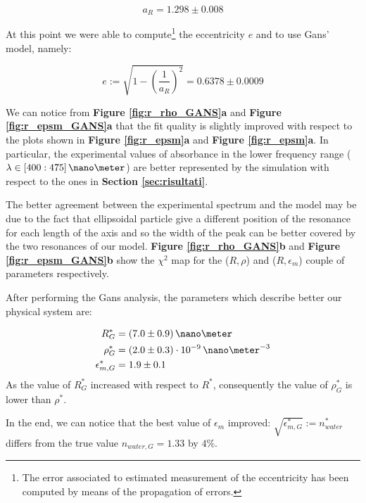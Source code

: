 \documentclass[twocolumn]{article}
\begin{document}
\begin{multicols}{2}
\[a_R=1.298\pm 0.008\]

At this point we were able to compute\footnote{The error associated to estimated measurement of the eccentricity has been computed by means of the propagation of errors.} the eccentricity $e$ and to use Gans' model, namely:

\[e:=\sqrt{1-\left(\frac{1}{a_R}\right)^2} = 0.6378 \pm 0.0009\]

We can notice from \textbf{Figure \ref{fig:r_rho_GANS}a} and \textbf{Figure \ref{fig:r_epsm_GANS}a } that the fit quality is slightly improved with respect to the plots shown in \textbf{Figure \ref{fig:r_epsm}a} and \textbf{Figure \ref{fig:r_epsm}a}. In particular, the experimental values of absorbance in the lower frequency range ($\lambda \in [400:475]\, \nano\meter$) are better represented by the simulation with respect to the ones in \textbf{Section \ref{sec:risultati}}.

The better agreement between the experimental spectrum and the model may be due  to the fact that ellipsoidal particle give a different position of the resonance for each length of the axis and so the width of the peak can be better covered by the two resonances of our model. \textbf{Figure \ref{fig:r_rho_GANS}b} and \textbf{Figure \ref{fig:r_epsm_GANS}b} show the $\chi^2$ map  for the ($R,\rho$) and ($R,\epsilon_m$) couple of parameters respectively.

After performing the Gans analysis, the parameters which describe better our physical system are:

\begin{align*}
    R^*_{G}&=(7.0\pm 0.9)\,\nano\meter \\
    \rho^*_{G}&=(2.0\pm 0.3)\cdot 10^{-9}\,\nano\meter^{-3} \\
    \epsilon_{m,G}^* &= 1.9 \pm 0.1
\end{align*}
As the value of $R^*_G$ increased with respect to $R^*$, consequently the value of $\rho_G^*$ is lower than $\rho^*$.

In the end, we can notice that the best value of $\epsilon_m$ improved: $\sqrt{\epsilon_{m,G} ^*} := n_{water}^*$ differs from the true value $n_{water,G}=1.33$ by $4\%$.

\end{multicols}
\newpage
\end{document}
